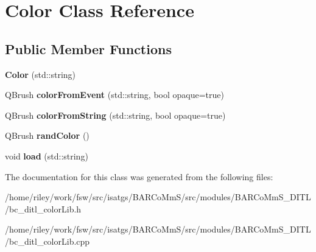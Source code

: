 \hypertarget{class_color}{}\section{Color Class Reference}
\label{class_color}
\subsection*{Public Member Functions}
\begin{DoxyCompactItemize}
\item 
{\bfseries Color} (std\+::string)\hypertarget{class_color_a6197debe831c5196234e088127bdb5dd}{}\label{class_color_a6197debe831c5196234e088127bdb5dd}

\item 
Q\+Brush {\bfseries color\+From\+Event} (std\+::string, bool opaque=true)\hypertarget{class_color_a537b119614ded99717825c126055ee1a}{}\label{class_color_a537b119614ded99717825c126055ee1a}

\item 
Q\+Brush {\bfseries color\+From\+String} (std\+::string, bool opaque=true)\hypertarget{class_color_a652fa6e29a5e4644e5768d2fa3878dc6}{}\label{class_color_a652fa6e29a5e4644e5768d2fa3878dc6}

\item 
Q\+Brush {\bfseries rand\+Color} ()\hypertarget{class_color_aa98c9fa2cc6ba5f40b32c7e6f0773e0c}{}\label{class_color_aa98c9fa2cc6ba5f40b32c7e6f0773e0c}

\item 
void {\bfseries load} (std\+::string)\hypertarget{class_color_a922d7d5a271232841fbf6f5c044579af}{}\label{class_color_a922d7d5a271232841fbf6f5c044579af}

\end{DoxyCompactItemize}


The documentation for this class was generated from the following files\+:\begin{DoxyCompactItemize}
\item 
/home/riley/work/fsw/src/isatgs/\+B\+A\+R\+Co\+Mm\+S/src/modules/\+B\+A\+R\+Co\+Mm\+S\+\_\+\+D\+I\+T\+L/bc\+\_\+ditl\+\_\+color\+Lib.\+h\item 
/home/riley/work/fsw/src/isatgs/\+B\+A\+R\+Co\+Mm\+S/src/modules/\+B\+A\+R\+Co\+Mm\+S\+\_\+\+D\+I\+T\+L/bc\+\_\+ditl\+\_\+color\+Lib.\+cpp\end{DoxyCompactItemize}
